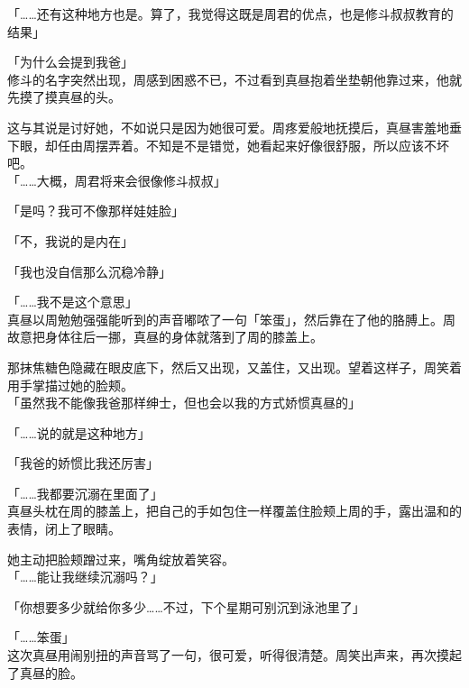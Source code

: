 「……还有这种地方也是。算了，我觉得这既是周君的优点，也是修斗叔叔教育的结果」

「为什么会提到我爸」\\

修斗的名字突然出现，周感到困惑不已，不过看到真昼抱着坐垫朝他靠过来，他就先摸了摸真昼的头。

这与其说是讨好她，不如说只是因为她很可爱。周疼爱般地抚摸后，真昼害羞地垂下眼，却任由周摆弄着。不知是不是错觉，她看起来好像很舒服，所以应该不坏吧。\\

「……大概，周君将来会很像修斗叔叔」

「是吗？我可不像那样娃娃脸」

「不，我说的是内在」

「我也没自信那么沉稳冷静」

「……我不是这个意思」\\

真昼以周勉勉强强能听到的声音嘟哝了一句「笨蛋」，然后靠在了他的胳膊上。周故意把身体往后一挪，真昼的身体就落到了周的膝盖上。

那抹焦糖色隐藏在眼皮底下，然后又出现，又盖住，又出现。望着这样子，周笑着用手掌描过她的脸颊。\\

「虽然我不能像我爸那样绅士，但也会以我的方式娇惯真昼的」

「……说的就是这种地方」

「我爸的娇惯比我还厉害」

「……我都要沉溺在里面了」\\

真昼头枕在周的膝盖上，把自己的手如包住一样覆盖住脸颊上周的手，露出温和的表情，闭上了眼睛。

她主动把脸颊蹭过来，嘴角绽放着笑容。\\

「……能让我继续沉溺吗？」

「你想要多少就给你多少……不过，下个星期可别沉到泳池里了」

「……笨蛋」\\

这次真昼用闹别扭的声音骂了一句，很可爱，听得很清楚。周笑出声来，再次摸起了真昼的脸。
